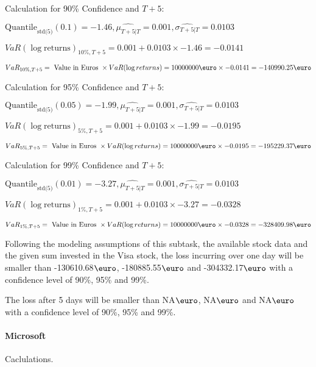 Calculation for 90\% Confidence and $T+5$:

\indent\indent $\text{Quantile}_\text{std(5)}(0.1) = -1.46,\hat{\mu_{T+5|T}} = 0.001, \hat{\sigma_{T+5|T}} = 0.0103$

\indent\indent $VaR(\log \text{returns})_{10\%, T + 5} = 0.001 + 0.0103\times-1.46 = -0.0141$

\indent\indent $VaR_{10\%, T + 5} = \text{ Value in Euros } \times VaR(\log returns) = 10 000 000 \text{\euro} \times-0.0141 = -140990.25 \text{\euro}$\newline




Calculation for 95\% Confidence and $T+5$:

\indent\indent $\text{Quantile}_\text{std(5)}(0.05) = -1.99,\hat{\mu_{T+5|T}} = 0.001, \hat{\sigma_{T+5|T}} = 0.0103$

\indent\indent $VaR(\log \text{returns})_{5\%, T + 5} = 0.001 + 0.0103\times-1.99 = -0.0195$

\indent\indent $VaR_{5\%, T + 5} = \text{ Value in Euros } \times VaR(\log returns) = 10 000 000 \text{\euro} \times-0.0195 = -195229.37 \text{\euro}$\newline




Calculation for 99\% Confidence and $T+5$:

\indent\indent $\text{Quantile}_\text{std(5)}(0.01) = -3.27,\hat{\mu_{T+5|T}} = 0.001, \hat{\sigma_{T+5|T}} = 0.0103$

\indent\indent $VaR(\log \text{returns})_{1\%, T + 5} = 0.001 + 0.0103\times-3.27 = -0.0328$

\indent\indent $VaR_{1\%, T + 5} = \text{ Value in Euros } \times VaR(\log returns) = 10 000 000 \text{\euro} \times-0.0328 = -328409.98 \text{\euro}$\newline


Following the modeling assumptions of this subtask, the available stock data and the given sum invested in the Visa stock, the loss incurring over one day will be smaller than -130610.68$\text{\euro}$, -180885.55$\text{\euro}$  and -304332.17$\text{\euro}$  with a confidence level of 90\%, 95\%  and 99\%.

The loss after 5 days will be smaller than NA$\text{\euro}$, NA$\text{\euro}$  and NA$\text{\euro}$  with a confidence level of 90\%, 95\%  and 99\%.


\paragraph{Microsoft} Caclulations.\newline \indent 




